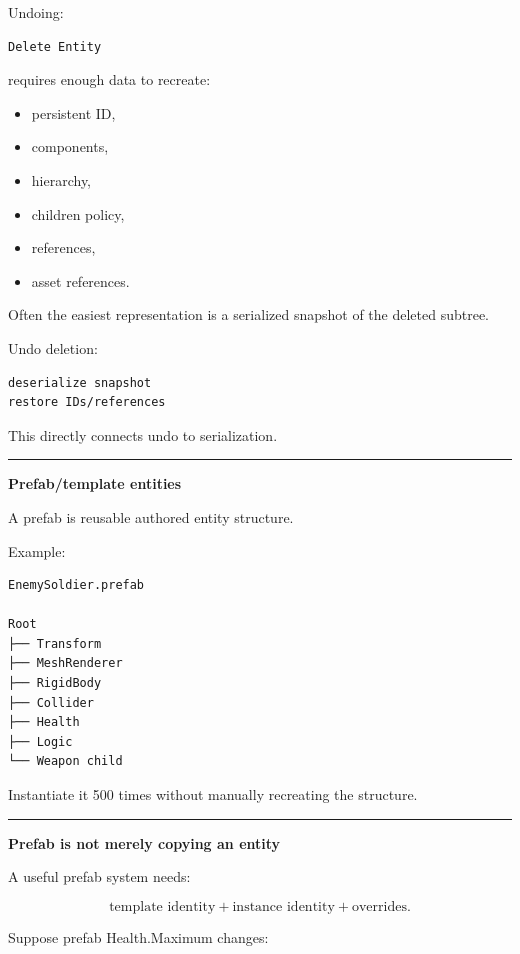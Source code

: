 Undoing:

\begin{verbatim}
Delete Entity
\end{verbatim}

requires enough data to recreate:

\begin{itemize}
\tightlist
\item
  persistent ID,
\item
  components,
\item
  hierarchy,
\item
  children policy,
\item
  references,
\item
  asset references.
\end{itemize}

Often the easiest representation is a serialized snapshot of the deleted subtree.

Undo deletion:

\begin{verbatim}
deserialize snapshot
restore IDs/references
\end{verbatim}

This directly connects undo to serialization.

\begin{center}\rule{0.5\linewidth}{0.5pt}\end{center}

\textbf{Prefab/template entities}

A prefab is reusable authored entity structure.

Example:

\begin{verbatim}
EnemySoldier.prefab

Root
├── Transform
├── MeshRenderer
├── RigidBody
├── Collider
├── Health
├── Logic
└── Weapon child
\end{verbatim}

Instantiate it 500 times without manually recreating the structure.

\begin{center}\rule{0.5\linewidth}{0.5pt}\end{center}

\textbf{Prefab is not merely copying an entity}

A useful prefab system needs:

\[
\text{template identity}
+
\text{instance identity}
+
\text{overrides}.
\]

Suppose prefab Health.Maximum changes:

